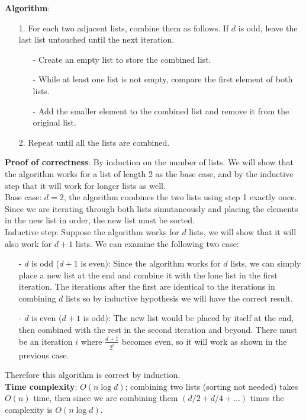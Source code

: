 \documentclass{article}
\begin{document}
\begin{itemize}
            \textbf{Algorithm}:
            \begin{itemize}
                  \item [1.] For each two adjacent lists, combine them as follows. If $d$ is odd, leave the last list untouched until the next iteration.
                        \begin{itemize}
                              \item [-] Create an empty list to store the combined list.
                              \item [-] While at least one list is not empty, compare the first element of both lists.
                              \item [-] Add the smaller element to the combined list and remove it from the original list.
                        \end{itemize}
                  \item [2.] Repeat until all the lists are combined.
            \end{itemize}
            \textbf{Proof of correctness}: By induction on the number of lists. We will show that the algorithm works for a list of length 2 as the base case, and by the inductive step that it will work for longer lists as well.\\
            Base case: $d=2$, the algorithm combines the two lists using step 1 exactly once. Since we are iterating through both lists simutaneously and placing the elements in the new list in order, the new list must be sorted.\\
            Inductive step: Suppose the algorithm works for $d$ lists, we will show that it will also work for $d+1$ lists. We can examine the following two case:
            \begin{itemize}
                  \item [-] $d$ is odd ($d+1$ is even): Since the algorithm works for $d$ lists, we can simply place a new list at the end and combine it with the lone list in the first iteration. The iterations after the first are identical to the iterations in combining $d$ lists so by inductive hypothesis we will have the correct result.
                  \item [-] $d$ is even ($d+1$ is odd): The new list would be placed by itself at the end, then combined with the rest in the second iteration and beyond. There must be an iteration $i$ where $\frac{d+1}{2^i}$ becomes even, so it will work as shown in the previous case.
            \end{itemize}
            Therefore this algorithm is correct by induction.\\
            \textbf{Time complexity}: $O(n\log d)$; combining two lists (sorting not needed) takes $O(n)$ time, then since we are combining them $(d/2+d/4+\ldots)$ times the complexity is $O(n\log d)$.
\end{itemize}
\end{document}
